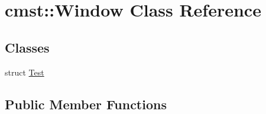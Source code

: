 \hypertarget{classcmst_1_1_window}{}\section{cmst\+:\+:Window Class Reference}
\label{classcmst_1_1_window}
\subsection*{Classes}
\begin{DoxyCompactItemize}
\item 
struct \hyperlink{structcmst_1_1_window_1_1_test}{Test}
\end{DoxyCompactItemize}
\subsection*{Public Member Functions}
